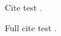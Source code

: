 \documentclass{article}
\begin{document}
    Cite test \cite{savall2001}.

    Full cite test .

    \nocite{*}

    \printbibliography
\end{document}
